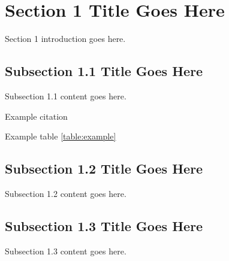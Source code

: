 \section{Section 1 Title Goes Here}\label{sec:1}
Section 1 introduction goes here.

\subsection{Subsection 1.1 Title Goes Here}\label{subsec:1.1}
Subsection 1.1 content goes here.

Example citation \cite{Nobody06}

Example table \ref{table:example}
\begin{table}
    \centering
    
\end{table}

\subsection{Subsection 1.2 Title Goes Here}\label{subsec:1.2}
Subsection 1.2 content goes here.

\subsection{Subsection 1.3 Title Goes Here}\label{subsec:1.3}
Subsection 1.3 content goes here.
